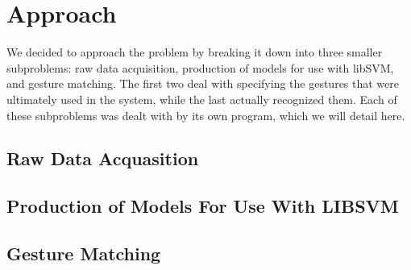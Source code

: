 \documentclass[11pt,conference]{IEEEtran}
\begin{document}
\section{Approach}
We decided to approach the problem by breaking it down into three smaller subproblems: raw data acquisition, production of models for use with libSVM, and gesture matching. The first two deal with specifying the gestures that were ultimately used in the system, while the last actually recognized them. Each of these subproblems was dealt with by its own program, which we will detail here.
\subsection{Raw Data Acquasition}

\subsection{Production of Models For Use With LIBSVM}

\subsection{Gesture Matching}
\end{document}
